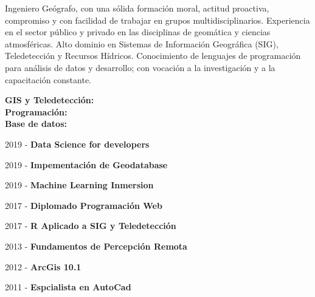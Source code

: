 \justify
Ingeniero Geógrafo, con una sólida formación moral, actitud proactiva, compromiso y con facilidad de trabajar en grupos multidisciplinarios. Experiencia en el sector público y privado en las disciplinas de geomática y ciencias atmosféricas. Alto dominio en Sistemas de Información Geográﬁca (SIG), Teledetección y Recursos Hídricos. Conocimiento de lenguajes de programación para análisis de datos y desarrollo; con vocación a la investigación y a la capacitación constante.






\textbf{GIS y Teledetección:}\\
\divider\smallskip
\textbf{Programación:}\\
\cvtag{\LaTeX}
\divider\smallskip
\textbf{Base de datos:}\\



\item 2019 - \textbf{Data Science for developers}
\item 2019 - \textbf{Impementación de Geodatabase}
\item 2019 - \textbf{Machine Learning Inmersion}
\item 2017 - \textbf{Diplomado Programación Web}
\item 2017 - \textbf{R Aplicado a SIG y Teledetección}
\item 2013 - \textbf{Fundamentos de Percepción Remota}
\item 2012 - \textbf{ArcGis 10.1}
\item 2011 - \textbf{Espcialista en AutoCad}

\divider

